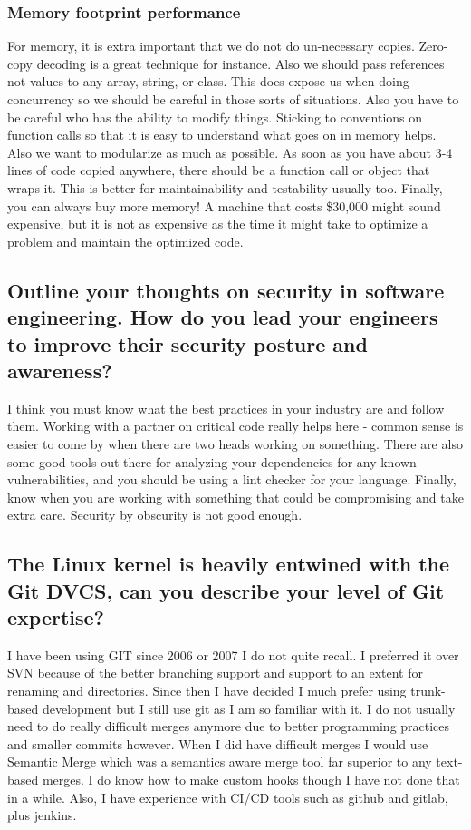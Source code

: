 \documentclass[letter,12pt]{article}
\begin{document}
\subsubsection{Memory footprint performance}
For memory, it is extra important that we do not do un-necessary copies. Zero-copy decoding is a great technique for instance. Also we should pass references not values to any array, string, or class. This does expose us when doing concurrency so we should be careful in those sorts of situations. Also you have to be careful who has the ability to modify things. Sticking to conventions on function calls so that it is easy to understand what goes on in memory helps. Also we want to modularize as much as possible. As soon as you have about 3-4 lines of code copied anywhere, there should be a function call or object that wraps it. This is better for maintainability and testability usually too. Finally, you can always buy more memory! A machine that costs \$30,000 might sound expensive, but it is not as expensive as the time it might take to optimize a problem and maintain the optimized code.

\subsection{Outline your thoughts on security in software engineering. How do you lead your engineers to improve their security posture and awareness?}
I think you must know what the best practices in your industry are and follow them. Working with a partner on critical code really helps here - common sense is easier to come by when there are two heads working on something. There are also some good tools out there for analyzing your dependencies for any known vulnerabilities, and you should be using a lint checker for your language. Finally, know when you are working with something that could be compromising and take extra care. Security by obscurity is not good enough.

\subsection{The Linux kernel is heavily entwined with the Git DVCS, can you describe your level of Git expertise?}
I have been using GIT since 2006 or 2007 I do not quite recall. I preferred it over SVN because of the better branching support and support to an extent for renaming and directories. Since then I have decided I much prefer using trunk-based development but I still use git as I am so familiar with it. I do not usually need to do really difficult merges anymore due to better programming practices and smaller commits however. When I did have difficult merges I would use Semantic Merge which was a semantics aware merge tool far superior to any text-based merges. I do know how to make custom hooks though I have not done that in a while. Also, I have experience with CI/CD tools such as github and gitlab, plus jenkins.
\end{document}
